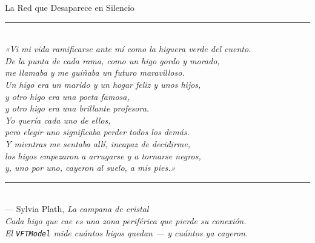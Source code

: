 %
%
\begin{frame}{La Red que Desaparece en Silencio}
  \vspace{0.12cm}
  \begin{center}
    {\color{ColorAcento}\rule{0.72\textwidth}{0.9pt}}\\[0.22cm]
    {\small\itshape\color{ColorPrincipal}
      «Vi mi vida ramificarse ante mí como la higuera verde del cuento.\\[0.08cm]
      De la punta de cada rama, como un higo gordo y morado,\\
      me llamaba y me guiñaba un futuro maravilloso.\\[0.10cm]
      Un higo era un marido y un hogar feliz y unos hijos,\\
      y otro higo era una poeta famosa,\\
      y otro higo era una brillante profesora.\\[0.10cm]
      Yo quería cada uno de ellos,\\
      pero elegir uno significaba perder todos los demás.\\[0.10cm]
      Y mientras me sentaba allí, incapaz de decidirme,\\
      los higos empezaron a arrugarse y a tornarse negros,\\
      y, uno por uno, cayeron al suelo, a mis pies.»}\\[0.22cm]
    {\color{ColorAcento}\rule{0.72\textwidth}{0.9pt}}\\[0.14cm]
    {\scriptsize\color{gray!60}
      --- Sylvia Plath, \textit{La campana de cristal}
      \citep{plath2019campana}}\\[0.14cm]
    {\scriptsize\itshape\color{ColorPrincipal}
      Cada higo que cae es una zona periférica que pierde su conexión.\\
      El \texttt{VFTModel} mide cuántos higos quedan — y cuántos ya cayeron.}
    \vfill
  \end{center}
\end{frame}

